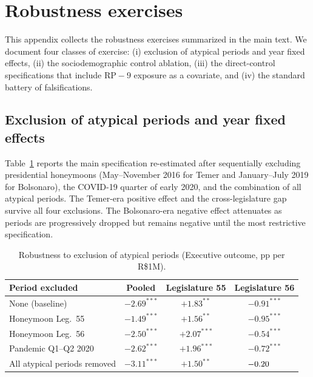 \documentclass[preprint,12pt,authoryear]{elsarticle}
\begin{document}
\section{Robustness exercises}
\label{app:robustness}

This appendix collects the robustness exercises summarized in the main text. We document four classes of exercise: (i) exclusion of atypical periods and year fixed effects, (ii) the sociodemographic control ablation, (iii) the direct-control specifications that include $\mathrm{RP-9}$ exposure as a covariate, and (iv) the standard battery of falsifications.

\subsection{Exclusion of atypical periods and year fixed effects}
\label{appsub:atypical}

Table~\ref{tab:atypical} reports the main specification re-estimated after sequentially excluding presidential honeymoons (May--November 2016 for Temer and January--July 2019 for Bolsonaro), the COVID-19 quarter of early 2020, and the combination of all atypical periods. The Temer-era positive effect and the cross-legislature gap survive all four exclusions. The Bolsonaro-era negative effect attenuates as periods are progressively dropped but remains negative until the most restrictive specification.

\begin{table}[htbp]
\centering
\caption{Robustness to exclusion of atypical periods (Executive outcome, pp per R\$1M).}
\label{tab:atypical}
\begin{threeparttable}
\small
\begin{tabular}{lccc}
\toprule
Period excluded & Pooled & Legislature 55 & Legislature 56 \\
\midrule
None (baseline)              & $-2.69^{***}$ & $+1.83^{**}$  & $-0.91^{***}$ \\
Honeymoon Leg.~55             & $-1.49^{***}$ & $+1.56^{**}$  & $-0.95^{***}$ \\
Honeymoon Leg.~56             & $-2.50^{***}$ & $+2.07^{***}$ & $-0.54^{***}$ \\
Pandemic Q1--Q2 2020         & $-2.62^{***}$ & $+1.96^{***}$ & $-0.72^{***}$ \\
All atypical periods removed & $-3.11^{***}$ & $+1.50^{**}$  & $-0.20\hspace{1.4em}$ \\
\bottomrule
\end{tabular}
\end{threeparttable}
\end{table}
\end{document}

